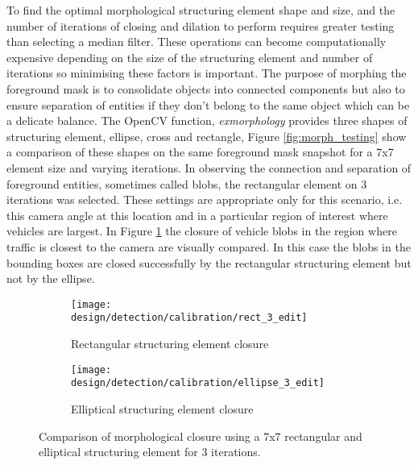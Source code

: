 To find the optimal morphological structuring element shape and size, and the number of iterations of closing and dilation to perform requires greater testing than selecting a median filter. These operations can become computationally expensive depending on the size of the structuring element and number of iterations so minimising these factors is important. The purpose of morphing the foreground mask is to consolidate objects into connected components but also to ensure separation of entities if they don't belong to the same object which can be a delicate balance. The OpenCV function, \emph{exmorphology} provides three shapes of structuring element, ellipse, cross and rectangle, Figure \ref{fig:morph_testing} show a comparison of these shapes on the same foreground mask snapshot for a 7x7 element size and varying iterations. In observing the connection and separation of foreground entities, sometimes called blobs, the rectangular element on 3 iterations was selected. These settings are appropriate only for this scenario, i.e. this camera angle at this location and in a particular region of interest where vehicles are largest. In Figure \ref{fig:compare_closure} the closure of vehicle blobs in the region where traffic is closest to the camera are visually compared. In this case the blobs in the bounding boxes are closed successfully by the rectangular structuring element but not by the ellipse.


\begin{figure}[htbp]
    \centering
    \begin{subfigure}[b]{0.42\textwidth}
        \texttt{[image: design/detection/calibration/rect\_3\_edit]}
        \captionsetup{format = hang}
        \caption{Rectangular structuring element closure}
    \end{subfigure}
    \begin{subfigure}[b]{0.42\textwidth}
        \texttt{[image: design/detection/calibration/ellipse\_3\_edit]}
        \captionsetup{format = hang}
        \caption{Elliptical structuring element closure}
    \end{subfigure}
    \captionsetup{format = hang}
    \caption{Comparison of morphological closure using a 7x7 rectangular and elliptical structuring element for 3 iterations.}
    \label{fig:compare_closure}
\end{figure}


